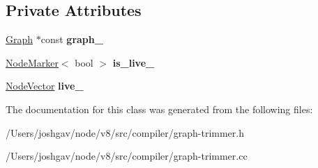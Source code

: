 \subsection*{Private Attributes}
\begin{DoxyCompactItemize}
\item 
\hyperlink{classv8_1_1internal_1_1compiler_1_1_graph}{Graph} $\ast$const {\bfseries graph\+\_\+}\hypertarget{classv8_1_1internal_1_1compiler_1_1_graph_trimmer_a782e5a5a4bb09e8a482cbafb19f58330}{}\label{classv8_1_1internal_1_1compiler_1_1_graph_trimmer_a782e5a5a4bb09e8a482cbafb19f58330}

\item 
\hyperlink{classv8_1_1internal_1_1compiler_1_1_node_marker}{Node\+Marker}$<$ bool $>$ {\bfseries is\+\_\+live\+\_\+}\hypertarget{classv8_1_1internal_1_1compiler_1_1_graph_trimmer_a1144fb1c565cb72c08d967589e6675cc}{}\label{classv8_1_1internal_1_1compiler_1_1_graph_trimmer_a1144fb1c565cb72c08d967589e6675cc}

\item 
\hyperlink{classv8_1_1internal_1_1_zone_vector}{Node\+Vector} {\bfseries live\+\_\+}\hypertarget{classv8_1_1internal_1_1compiler_1_1_graph_trimmer_a0d3d55be700d8264a31cd02ba79f9ef3}{}\label{classv8_1_1internal_1_1compiler_1_1_graph_trimmer_a0d3d55be700d8264a31cd02ba79f9ef3}

\end{DoxyCompactItemize}


The documentation for this class was generated from the following files\+:\begin{DoxyCompactItemize}
\item 
/\+Users/joshgav/node/v8/src/compiler/graph-\/trimmer.\+h\item 
/\+Users/joshgav/node/v8/src/compiler/graph-\/trimmer.\+cc\end{DoxyCompactItemize}
